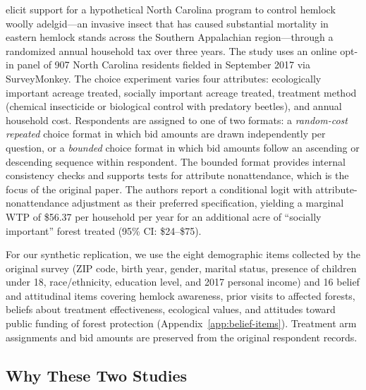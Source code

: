 \documentclass[12pt]{article}
\begin{document}
\textcite{Giguere2020} elicit support for a hypothetical North Carolina
program to control hemlock woolly adelgid---an invasive insect that has
caused substantial mortality in eastern hemlock stands across the Southern
Appalachian region---through a randomized annual household tax over three
years. The study uses an online opt-in panel of 907 North Carolina
residents fielded in September 2017 via SurveyMonkey.
The choice experiment varies four attributes: ecologically important
acreage treated, socially important acreage treated, treatment method
(chemical insecticide or biological control with predatory beetles), and
annual household cost. Respondents are assigned to one of two formats: a
\textit{random-cost repeated} choice format in which bid amounts are drawn
independently per question, or a \textit{bounded} choice format in which
bid amounts follow an ascending or descending sequence within respondent.
The bounded format provides internal consistency checks and supports tests
for attribute nonattendance, which is the focus of the original paper.
The authors report a conditional logit with attribute-nonattendance
adjustment as their preferred specification, yielding a marginal WTP of
\$56.37 per household per year for an additional acre of ``socially
important'' forest treated (95\% CI: \$24--\$75).

For our synthetic replication, we use the eight demographic items
collected by the original survey (ZIP code, birth year, gender, marital
status, presence of children under 18, race/ethnicity, education level,
and 2017 personal income) and 16 belief and attitudinal items
covering hemlock awareness, prior visits to affected forests, beliefs
about treatment effectiveness, ecological values, and attitudes toward
public funding of forest protection (Appendix~\ref{app:belief-items}).
Treatment arm assignments and bid amounts are preserved from the original
respondent records.

\subsection{Why These Two Studies}\label{sec:data-why}
\end{document}
